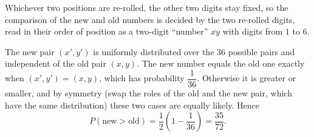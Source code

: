 Whichever two positions are re-rolled, the other two digits stay fixed, so the comparison of the new and old numbers is decided by the two re-rolled digits, read in their order of position as a two-digit ``number'' $\overline{xy}$ with digits from $1$ to $6$.

The new pair $(x',y')$ is uniformly distributed over the $36$ possible pairs and independent of the old pair $(x,y)$. The new number equals the old one exactly when $(x',y')=(x,y)$, which has probability $\dfrac{1}{36}$. Otherwise it is greater or smaller, and by symmetry (swap the roles of the old and the new pair, which have the same distribution) these two cases are equally likely. Hence
\[
P(\text{new}>\text{old})=\dfrac{1}{2}\left(1-\dfrac{1}{36}\right)=\boxed{\dfrac{35}{72}}.
\]
